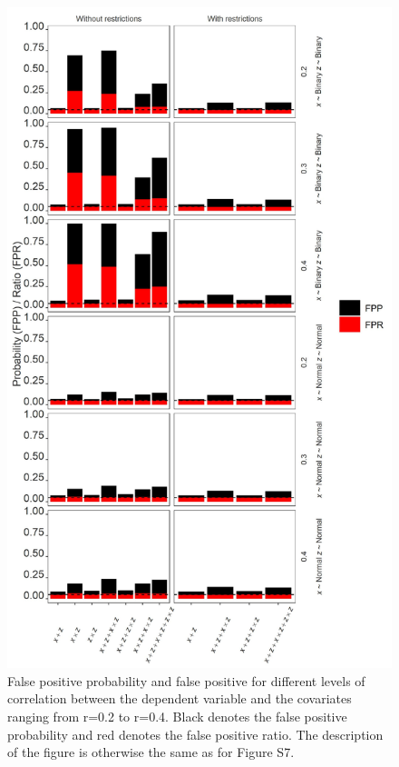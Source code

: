 \begin{figure}[hbt!]
\includegraphics[scale=0.7]{R/Analysis/Result/Figures/Figure2SIBon.jpeg}
\centering
\caption{False positive probability and false positive for different levels of correlation between the dependent variable and the covariates ranging from r=0.2 to r=0.4. Black denotes the false positive probability and red denotes the false positive ratio. The description of the figure is otherwise the same as for Figure S7.}
\label{fig:mainfigure}
\end{figure}


